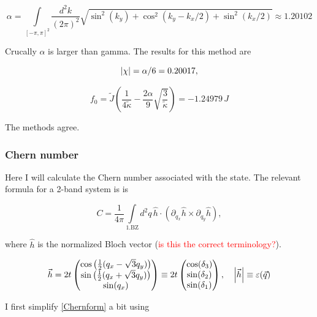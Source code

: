 \documentclass[../../../main.tex]{subfiles}
\begin{document}
\begin{equation}
	\alpha = \int\limits_{[-\pi,\pi]^2} \frac{d^2k}{(2\pi)^2} \sqrt{\sin^2(k_y) + \cos^2(k_y-k_x/2) + \sin^2(k_x/2)} \approx 1.20102
\end{equation}

Crucally $\alpha$ is larger than gamma. The results for this method are

\begin{equation}
	\abs{\chi} = \alpha/6  = 0.20017,
\end{equation}


\begin{equation}
f_0 =\tilde{J} \left(\frac{1}{4\tilde{\kappa}} - \frac{2\alpha}{9} \sqrt{\frac{3}{\tilde{\kappa}}}\right) = -1.24979 \, J
\end{equation}

The methods agree.

\subsubsection{Chern number}

Here I will calculate the Chern number associated with the state. The relevant formula for a 2-band system is is 

\begin{equation}\label{Chernform}
	C = \frac{1}{4\pi} \int\limits_{\text{1.BZ}} d^2q \, \hat{h} \cdot \left(\partial_{q_x} \hat{h} \times \partial_{q_y} \hat{h}\right),
\end{equation}

where $\hat{h}$ is the normalized Bloch vector (\textcolor{red}{is this the correct terminology?}).

\begin{equation}
	\vec{h} = 2t
	\begin{pmatrix}
		\cos\left(\frac12(q_x - \sqrt{3}q_y)\right) \\
		\sin\left(\frac12(q_x + \sqrt{3}q_y)\right) \\
		\sin(q_x)
	\end{pmatrix} \equiv 2t
	\begin{pmatrix}
		\cos(\delta_3) \\
		\sin(\delta_2) \\
		\sin(\delta_1)
	\end{pmatrix}, \quad \abs{\vec{h}} \equiv \varepsilon(\vec{q})
\end{equation}

I first simplify \ref{Chernform} a bit using
\end{document}
